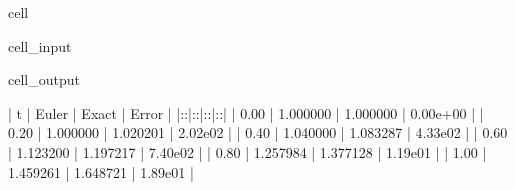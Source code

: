 \documentclass[letterpaper,10pt,english]{jupyterBook}
\begin{document}
\begin{sphinxuseclass}{cell}
\begin{sphinxVerbatimInput}
\begin{sphinxuseclass}{cell_input}
\begin{sphinxVerbatim}[commandchars=\\\{\}]
   
    \PYG{p}{[}\PYG{p}{]}\PYG{p}{[}\PYG{p}{]}\PYG{p}{[}\PYG{p}{]}\PYG{p}{[}\PYG{p}{]}  \PYG{p}{[}\PYG{p}{]}
\end{sphinxVerbatim}

\end{sphinxuseclass}\end{sphinxVerbatimInput}
\begin{sphinxVerbatimOutput}

\begin{sphinxuseclass}{cell_output}
\begin{sphinxVerbatim}[commandchars=\\\{\}]
|  t   |   Euler   |   Exact   |  Error   |
|:\PYGZhy{}\PYGZhy{}\PYGZhy{}\PYGZhy{}:|:\PYGZhy{}\PYGZhy{}\PYGZhy{}\PYGZhy{}\PYGZhy{}\PYGZhy{}\PYGZhy{}\PYGZhy{}\PYGZhy{}:|:\PYGZhy{}\PYGZhy{}\PYGZhy{}\PYGZhy{}\PYGZhy{}\PYGZhy{}\PYGZhy{}\PYGZhy{}\PYGZhy{}:|:\PYGZhy{}\PYGZhy{}\PYGZhy{}\PYGZhy{}\PYGZhy{}\PYGZhy{}\PYGZhy{}\PYGZhy{}:|
| 0.00 |  1.000000 |  1.000000 | 0.00e+00 |
| 0.20 |  1.000000 |  1.020201 | 2.02e\PYGZhy{}02 |
| 0.40 |  1.040000 |  1.083287 | 4.33e\PYGZhy{}02 |
| 0.60 |  1.123200 |  1.197217 | 7.40e\PYGZhy{}02 |
| 0.80 |  1.257984 |  1.377128 | 1.19e\PYGZhy{}01 |
| 1.00 |  1.459261 |  1.648721 | 1.89e\PYGZhy{}01 |
\end{sphinxVerbatim}

\end{sphinxuseclass}\end{sphinxVerbatimOutput}

\end{sphinxuseclass}
\end{document}

